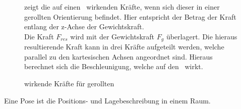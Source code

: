 \begin{figure}[ht!]
\vspace{0.25cm}
\begin{center}
\caption{wirkende Kräfte für gerollten \Quad\ }
\label{fig:ForcesRolled}
\end{center}

\vspace{0.25cm}
 zeigt die auf einen \Quad\ wirkenden Kräfte, wenn sich dieser in einer gerollten Orientierung befindet. Hier entspricht der Betrag der Kraft entlang der z-Achse der Gewichtskraft.\\
Die Kraft $F_{res}$ wird mit der Gewichtskraft $F_g$ überlagert. Die hieraus resultierende Kraft kann in drei Kräfte aufgeteilt werden, welche parallel zu den kartesischen Achsen angeordnet sind. Hieraus berechnet sich die Beschleunigung, welche auf den \Quad\ wirkt.
\end{figure}




Eine Pose ist die Positions- und Lagebeschreibung in einem Raum. \missing[quelle]










\missing



\missing










